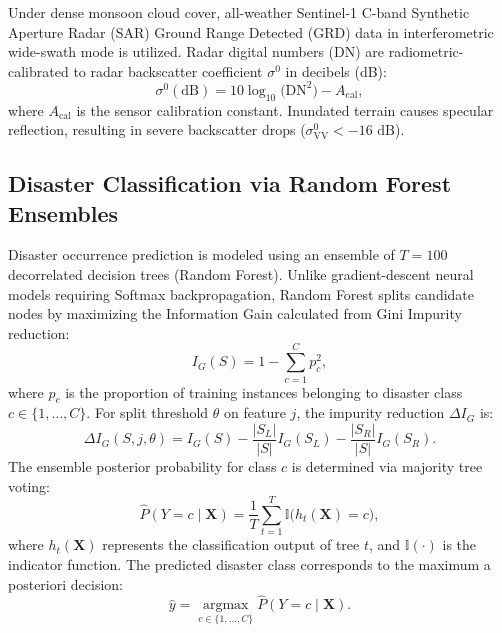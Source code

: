 \documentclass[conference]{IEEEtran}
\begin{document}
Under dense monsoon cloud cover, all-weather Sentinel-1 C-band Synthetic Aperture Radar (SAR) Ground Range Detected (GRD) data in interferometric wide-swath mode is utilized. Radar digital numbers (DN) are radiometric-calibrated to radar backscatter coefficient $\sigma^0$ in decibels (dB):
\begin{equation}
\sigma^0 (\text{dB}) = 10 \log_{10} \big( \text{DN}^2 \big) - A_{\text{cal}},
\label{eq:sar_sigma}
\end{equation}
where $A_{\text{cal}}$ is the sensor calibration constant. Inundated terrain causes specular reflection, resulting in severe backscatter drops ($\sigma^0_{\text{VV}} < -16\text{ dB}$).

\subsection{Disaster Classification via Random Forest Ensembles}
Disaster occurrence prediction is modeled using an ensemble of $T = 100$ decorrelated decision trees (Random Forest). Unlike gradient-descent neural models requiring Softmax backpropagation, Random Forest splits candidate nodes by maximizing the Information Gain calculated from Gini Impurity reduction:
\begin{equation}
I_G(S) = 1 - \sum_{c=1}^C p_c^2,
\label{eq:gini}
\end{equation}
where $p_c$ is the proportion of training instances belonging to disaster class $c \in \{1, \dots, C\}$. For split threshold $\theta$ on feature $j$, the impurity reduction $\Delta I_G$ is:
\begin{equation}
\Delta I_G(S, j, \theta) = I_G(S) - \frac{|S_L|}{|S|} I_G(S_L) - \frac{|S_R|}{|S|} I_G(S_R).
\label{eq:split}
\end{equation}
The ensemble posterior probability for class $c$ is determined via majority tree voting:
\begin{equation}
\hat{P}(Y = c \mid \mathbf{X}) = \frac{1}{T} \sum_{t=1}^T \mathbb{I}\big( h_t(\mathbf{X}) = c \big),
\label{eq:rf_prob}
\end{equation}
where $h_t(\mathbf{X})$ represents the classification output of tree $t$, and $\mathbb{I}(\cdot)$ is the indicator function. The predicted disaster class corresponds to the maximum a posteriori decision:
\begin{equation}
\hat{y} = \operatorname*{argmax}_{c \in \{1, \dots, C\}} \hat{P}(Y = c \mid \mathbf{X}).
\label{eq:argmax}
\end{equation}
\end{document}
